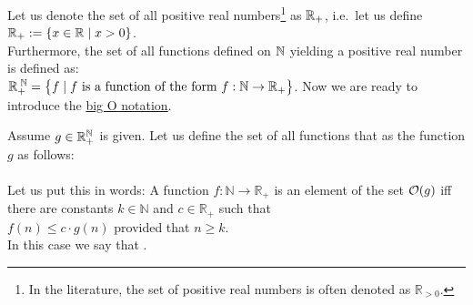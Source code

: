 Let us denote the set of all positive real numbers\footnote{
  In the literature, the set of positive real numbers is often denoted as $\mathbb{R}_{>0}$.}
as ${\mathbb R}_+$, i.e.~let us define 
\\[0.2cm]
\hspace*{1.3cm}
${\mathbb R}_+ := \{ x \in {\mathbb R} \mid x > 0 \}$. 
\\[0.2cm]
Furthermore, the set of all functions defined on  ${\mathbb N}$ yielding a positive real number is defined
as: 
\\[0.2cm]
\hspace*{1.3cm} 
${\mathbb R}_+^{\;{\mathbb N}} = \bigl\{ f \mid \mbox{$f$ is a function of the form $f: {\mathbb N} \rightarrow {\mathbb R}_+$} \bigr\}$. 
Now we are ready to introduce the \href{https://en.wikipedia.org/wiki/Big_O_notation}{big O notation}.

\begin{Definition}[$\Oh(g)$] 
Assume $g \in {\mathbb R}_+^{{\mathbb N}}$ is given.   Let us define the set of all functions that 
  as the function $g$ as follows: 
  \\[0.2cm]
  \hspace*{0.5cm} 
  \colorbox{red}{}
  \\[0.2cm]
  Let us put this in words: A function $f:\mathbb{N} \rightarrow \mathbb{R}_+$ is an element of the set
  $\Oh(g)$ iff there are constants $k \in \mathbb{N}$ and $c \in \mathbb{R}_+$ such that
  \\[0.2cm]
  \hspace*{1.3cm}
  $f(n) \leq c \cdot g(n)$ \quad provided that $n \geq k$.
  \\[0.2cm]
  In this case we say that .
  \eox
\end{Definition}

